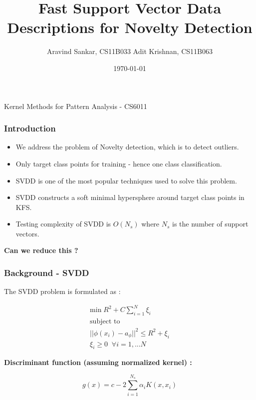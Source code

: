 \documentclass{beamer}
\title[Fast SVDD]{Fast Support Vector Data Descriptions for Novelty Detection} %
\author[CS6011]{Aravind Sankar, CS11B033 \newline Adit Krishnan, CS11B063 \newline}
\institute[IIT Madras] %
{
IIT Madras \\ %
}
\date{\today} %
\begin{document}
\begin{frame}
\titlepage %
\begin{center}
Kernel Methods for Pattern Analysis - CS6011
\end{center}
\end{frame}



\begin{frame}
\frametitle{Introduction}
\begin{itemize}
\item We address the problem of Novelty detection, which is to detect outliers.
\item Only target class points for training - hence one class classification.
\item SVDD is one of the most popular techniques used to solve this problem.
\item SVDD constructs a soft minimal hypersphere around target class points in KFS.
\item Testing complexity of SVDD is $O(N_s)$ where $N_s$ is the number of support vectors. \\[5pt]
\end{itemize}

\textbf{Can we reduce this ?}
\end{frame}




\begin{frame}
\frametitle{Background - SVDD}
The SVDD problem is formulated as :


\begin{equation}
\begin{split}
\text{min} \; R^2 + C \sum\limits_{i=1}^N \xi_i \\
\text{subject to}\\
||\phi(x_i) - a_{\phi}||^2  \leq R^2 + \xi_i \\
\xi_i \geq 0 \;\; \forall i = 1,...N
\end{split}
\end{equation}


\textbf{Discriminant function (assuming normalized kernel) : }

\[ g(x)  =  c - 2 \sum\limits_{i=1}^{N_s}\alpha_i K(x,x_i)\]

\end{frame}
\end{document}

